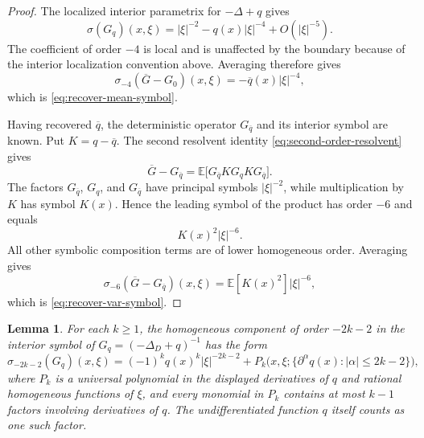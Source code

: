 \documentclass[11pt]{article}
\newcommand{\E}{\mathbb E}
\theoremstyle{plain}
\newtheorem{lemma}[theorem]{Lemma}
\theoremstyle{definition}
\theoremstyle{remark}
\begin{document}
\begin{proof}
The localized interior parametrix for $-\Delta+q$ gives
\[
  \sigma(G_q)(x,\xi)=|\xi|^{-2}-q(x)|\xi|^{-4}+O(|\xi|^{-5}).
\]
The coefficient of order $-4$ is local and is unaffected by the boundary because of the interior localization convention above.  Averaging therefore gives
\[
  \sigma_{-4}(\overline G-G_0)(x,\xi)=-\overline q(x)|\xi|^{-4},
\]
which is \eqref{eq:recover-mean-symbol}.

Having recovered $\overline q$, the deterministic operator $G_{\overline q}$ and its interior symbol are known.  Put $K=q-\overline q$.  The second resolvent identity \eqref{eq:second-order-resolvent} gives
\[
  \overline G-G_{\overline q}
  =\E\bigl[G_{\overline q}KG_qKG_{\overline q}\bigr].
\]
The factors $G_{\overline q}$, $G_q$, and $G_{\overline q}$ have principal symbols $|\xi|^{-2}$, while multiplication by $K$ has symbol $K(x)$.  Hence the leading symbol of the product has order $-6$ and equals
\[
  K(x)^2|\xi|^{-6}.
\]
All other symbolic composition terms are of lower homogeneous order.  Averaging gives
\[
  \sigma_{-6}(\overline G-G_{\overline q})(x,\xi)
  =\E[K(x)^2]|\xi|^{-6},
\]
which is \eqref{eq:recover-var-symbol}.
\end{proof}

\begin{lemma}\label{lem:Green-symbol-triangular}
For each $k\ge1$, the homogeneous component of order $-2k-2$ in the interior symbol of $G_q=(-\Delta_D+q)^{-1}$ has the form
\begin{equation}\label{eq:triangular-Green-symbol}
  \sigma_{-2k-2}(G_q)(x,\xi)
  =(-1)^kq(x)^k|\xi|^{-2k-2}
   +P_k\bigl(x,\xi;\{\partial^\alpha q(x):|\alpha|\le 2k-2\}\bigr),
\end{equation}
where $P_k$ is a universal polynomial in the displayed derivatives of $q$ and rational homogeneous functions of $\xi$, and every monomial in $P_k$ contains at most $k-1$ factors involving derivatives of $q$.  The undifferentiated function $q$ itself counts as one such factor.
\end{lemma}
\end{document}
